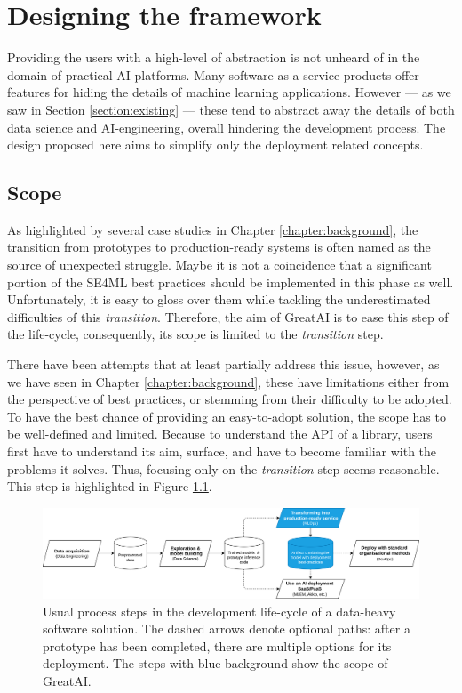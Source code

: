 \chapter{Designing the framework} \label{chapter:design}

Providing the users with a high-level of abstraction is not unheard of in the domain of practical AI platforms. Many software-as-a-service products offer features for hiding the details of machine learning applications. However --- as we saw in Section \ref{section:existing} --- these tend to abstract away the details of both data science and AI-engineering, overall hindering the development process. The design proposed here aims to simplify only the deployment related concepts.

\section{Scope} \label{section:scope}

As highlighted by several case studies in Chapter \ref{chapter:background}, the transition from prototypes to production-ready systems is often named as the source of unexpected struggle. Maybe it is not a coincidence that a significant portion of the SE4ML best practices should be implemented in this phase as well. Unfortunately, it is easy to gloss over them while tackling the underestimated difficulties of this \textit{transition}. Therefore, the aim of GreatAI is to ease this step of the life-cycle, consequently, its scope is limited to the \textit{transition} step.

There have been attempts that at least partially address this issue, however, as we have seen in Chapter \ref{chapter:background}, these have limitations either from the perspective of best practices, or stemming from their difficulty to be adopted. To have the best chance of providing an easy-to-adopt solution, the scope has to be well-defined and limited. Because to understand the API of a library, users first have to understand its aim, surface, and have to become familiar with the problems it solves. Thus, focusing only on the \textit{transition} step seems reasonable. This step is highlighted in Figure \ref{fig:scope}.

\begin{figure}
    \centering
    \includegraphics[width=\linewidth]{figures/scope.drawio.png}
    \caption{Usual process steps in the development life-cycle of a data-heavy software solution. The dashed arrows denote optional paths: after a prototype has been completed, there are multiple options for its deployment. The steps with blue background show the scope of GreatAI.}
    \label{fig:scope}
\end{figure}

